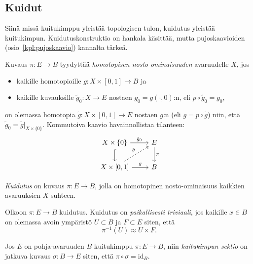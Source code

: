 \subsection{Kuidut}
Siinä missä kuitukimppu yleistää topologisen tulon, kuidutus yleistää kuitukimpun. Kuidutuskonstruktio on hankala käsittää, mutta pujoskaavioiden (osio~\ref{kpl:pujoskaavio}) kannalta tärkeä.
\begin{maaritelma}
    Kuvaus $\pi:E\to B$ tyydyttää \emph{homotopisen nosto-ominaisuuden} avaruudelle $X$, jos
    \begin{itemize}
        \item kaikille homotopioille $g:X\times[0,1]\to B$ ja
        \item kaikille kuvauksille $\tilde g_0:X\to E$ nostaen $g_0=g(\cdot,0)$:n, eli $p\circ\tilde g_0=g_0$,
    \end{itemize}
    on olemassa homotopia $\tilde g:X\times[0,1]\to E$ nostaen $g$:n (eli $g=p\circ\tilde g$) niin, että $\tilde g_0=\tilde g|_{X\times\{0\}}$. Kommutoiva kaavio havainnollistaa tilanteen:
    \begin{equation}
        \begin{tikzcd}
            X\times\{0\} \arrow[r, "\tilde g_0"] \arrow[d, hook] & E \arrow[d, "\pi"] \\
            X\times[0,1] \arrow[ur, dashrightarrow, "\tilde g"] \arrow[r, "g"] & B
        \end{tikzcd}
    \end{equation}
\end{maaritelma}
\begin{maaritelma}
    \emph{Kuidutus} on kuvaus $\pi:E\to B$, jolla on homotopinen nosto-ominaisuus kaikkien avaruuksien $X$ suhteen.
\end{maaritelma}
\begin{maaritelma}
    Olkoon $\pi:E\to B$ kuidutus. Kuidutus on \emph{paikallisesti triviaali}, jos kaikille $x\in B$ on olemassa avoin ympäristö $U\subset B$ ja $F\subset E$ siten, että 
    \begin{equation*}
        \pi^{-1}(U)\approx U\times F.
    \end{equation*}
\end{maaritelma}
\begin{maaritelma}
    Jos $E$ on pohja-avaruuden $B$ kuitukimppu $\pi:E\to B$, niin \emph{kuitukimpun sektio} on jatkuva kuvaus $\sigma:B\to E$ siten, että $\pi\circ\sigma=\text{id}_B$.
\end{maaritelma}


